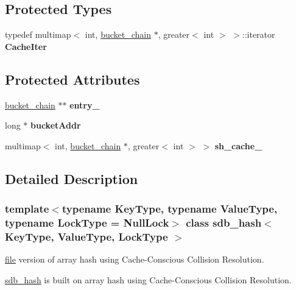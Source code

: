 \subsection*{Protected Types}
\begin{CompactItemize}
\item 
\hypertarget{classsdb__hash_df4db8b80f27271108713daee250bd2f}{
typedef multimap$<$ int, \hyperlink{classbucket__chain__}{bucket\_\-chain} $\ast$, greater$<$ int $>$ $>$::iterator \textbf{CacheIter}}
\label{classsdb__hash_df4db8b80f27271108713daee250bd2f}

\end{CompactItemize}
\subsection*{Protected Attributes}
\begin{CompactItemize}
\item 
\hypertarget{classsdb__hash_176b3804e4064ce796ee50c00c1cef68}{
\hyperlink{classbucket__chain__}{bucket\_\-chain} $\ast$$\ast$ \textbf{entry\_\-}}
\label{classsdb__hash_176b3804e4064ce796ee50c00c1cef68}

\item 
\hypertarget{classsdb__hash_2d79c743b5b5001f7fabefe183d1ee87}{
long $\ast$ \textbf{bucketAddr}}
\label{classsdb__hash_2d79c743b5b5001f7fabefe183d1ee87}

\item 
\hypertarget{classsdb__hash_a9ff81bc12174dab813aa25b1ffb83fc}{
multimap$<$ int, \hyperlink{classbucket__chain__}{bucket\_\-chain} $\ast$, greater$<$ int $>$ $>$ \textbf{sh\_\-cache\_\-}}
\label{classsdb__hash_a9ff81bc12174dab813aa25b1ffb83fc}

\end{CompactItemize}


\subsection{Detailed Description}
\subsubsection*{template$<$typename KeyType, typename ValueType, typename LockType = NullLock$>$ class sdb\_\-hash$<$ KeyType, ValueType, LockType $>$}

\hyperlink{classfile}{file} version of array hash using Cache-Conscious Collision Resolution. 

\hyperlink{classsdb__hash}{sdb\_\-hash} is built on array hash using Cache-Conscious Collision Resolution.

